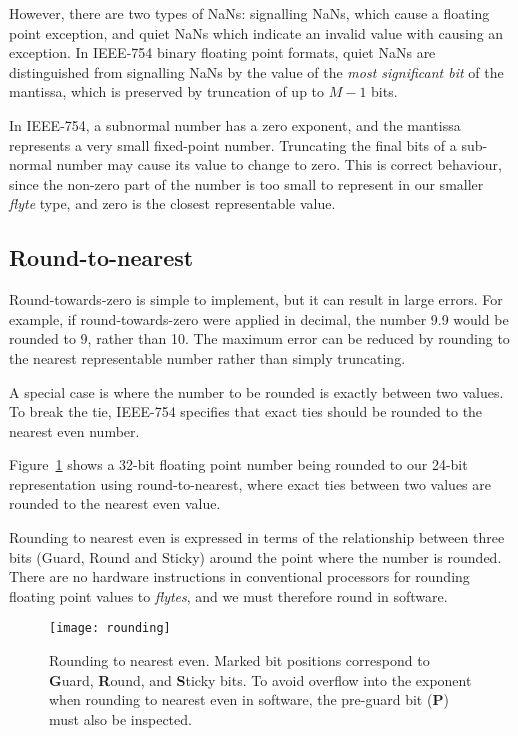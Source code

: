 \documentclass{sig-alternate-05-2015}
\begin{document}
However, there are two types of NaNs: signalling NaNs, which cause a floating
point exception, and quiet NaNs which indicate an invalid value with causing an
exception. In IEEE-754 binary floating point formats, quiet NaNs are
distinguished from signalling NaNs by the value of the \emph{most significant
bit} of the mantissa, which is preserved by truncation of up to $M-1$ bits.

In IEEE-754, a subnormal number has a zero exponent, and the mantissa
represents a very small fixed-point number. Truncating the final bits of a
sub-normal number may cause its value to change to zero. This is correct
behaviour, since the non-zero part of the number is too small to represent in
our smaller \textit{flyte} type, and zero is the closest representable value.


\subsection{Round-to-nearest}

Round-towards-zero is simple to implement, but it can result in large errors.
For example, if round-towards-zero were applied in decimal, the number 9.9
would be rounded to 9, rather than 10. The maximum error can be reduced by
rounding to the nearest representable number rather than simply truncating.

A special case is where the number to be rounded is exactly between two values.
To break the tie, IEEE-754 specifies that exact ties should be rounded to the
nearest even number.

Figure~\ref{fig:rounding} shows a 32-bit floating point number being rounded to
our 24-bit representation using round-to-nearest, where exact ties between two
values are rounded to the nearest even value.

Rounding to nearest even is expressed in terms of the relationship between
three bits (Guard, Round and Sticky) around the point where the number is
rounded. There are no hardware instructions in conventional processors for
rounding floating point values to \textit{flytes}, and we must therefore round
in software.

\begin{figure}[h]
\centering\texttt{[image: rounding]}
\caption{Rounding to nearest even. Marked bit positions correspond to
\textbf{G}uard, \textbf{R}ound, and \textbf{S}ticky bits. To avoid
overflow into the exponent when rounding to nearest even in
software, the pre-guard bit (\textbf{P}) must also be inspected.}
\label{fig:rounding}
\end{figure}
\end{document}
